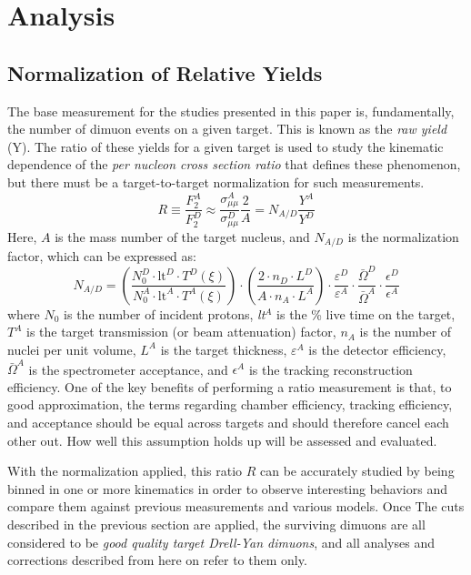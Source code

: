 \chapter{Analysis}

\section{Normalization of Relative Yields}

The base measurement for the studies presented in this paper is, fundamentally, the number of dimuon events on a given target. This is known as the \emph{raw yield} (Y). The ratio of these yields for a given target is used to study the kinematic dependence of the \emph{per nucleon cross section ratio} that defines these phenomenon, but there must be a target-to-target normalization for such measurements.
\begin{equation}
R \equiv \frac{F_2^A}{F_2^D} \approx \frac{\sigma_{\mu\mu}^A}{\sigma_{\mu\mu}^D} \frac{2}{A} = N_{A/D} \frac{Y^A}{Y^D}
\end{equation}
Here, $A$ is the mass number of the target nucleus, and $N_{A/D}$ is the normalization factor, which can be expressed as:
\begin{equation}
	N_{A/D} =
		\left(\frac{ N_0^D \cdot \text{lt}^D \cdot T^D(\xi)}{N_0^A \cdot \text{lt}^A \cdot T^A(\xi) } \right) \cdot 
		\left( \frac{ 2 \cdot n_D \cdot L^D }{ A \cdot n_A \cdot L^A } \right) \cdot 
		\frac{ \varepsilon^D }{ \varepsilon^A }  \cdot 
		\frac{ \bar{\Omega}^D }{\bar{ \Omega}^A } \cdot 
		\frac{ \epsilon^D }{ \epsilon^A }
\end{equation}
where $N_0$ is the number of incident protons, \emph{lt}$^A$ is the \% live time on the target, $T^A$ is the target transmission (or beam attenuation) factor, $n_A$ is the number of nuclei per unit volume, $L^A$ is the target thickness, $\varepsilon^A$ is the detector efficiency, $\bar{\Omega}^A$ is the spectrometer acceptance, and $\epsilon^A$ is the tracking reconstruction efficiency. One of the key benefits of performing a ratio measurement is that, to good approximation, the terms regarding chamber efficiency, tracking efficiency, and acceptance should be equal across targets and should therefore cancel each other out. How well this assumption holds up will be assessed and evaluated.

With the normalization applied, this ratio $R$ can be accurately studied by being binned in one or more kinematics in order to observe interesting behaviors and compare them against previous measurements and various models. Once The cuts described in the previous section are applied, the surviving dimuons are all considered to be \emph{good quality target Drell-Yan dimuons}, and all analyses and corrections described from here on refer to them only.

